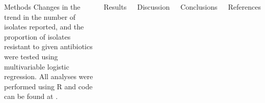 \documentclass[final]{beamer}
\begin{document}
\begin{frame}
\begin{columns}[t]
  \begin{block}{Methods}
   Changes in the trend in the number of isolates reported, and the proportion of isolates resistant to given antibiotics were tested using multivariable logistic regression. 
   All analyses were performed using R and code can be found at \url{}.
  \end{block}
  
    \begin{block}{Results}
   
  \end{block}
  
  \begin{block}{Discussion}
   
  \end{block}
  
  \begin{block}{Conclusions}
   
  \end{block}
  
  \begin{block}{References}
   

  \end{block}
 \end{columns}

\end{frame}
\end{document}
